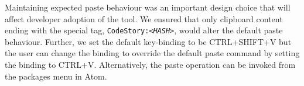 \documentclass[../manifest.tex]{subfiles}
\begin{document}
Maintaining expected paste behaviour was an important design choice that will affect developer adoption of the tool. We ensured that only clipboard content ending with the special tag, \texttt{CodeStory:\textit{<HASH>}}, would alter the default paste behaviour. Further, we set the default key-binding to be CTRL+SHIFT+V but the user can change the binding to override the default paste command by setting the binding to CTRL+V. Alternatively, the paste operation can be invoked from the packages menu in Atom.
\end{document}
